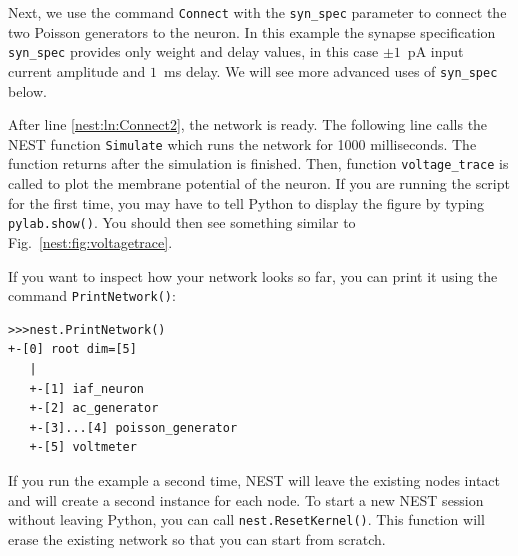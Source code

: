 \documentclass{article}
\begin{document}
Next, we use the command \lstinline!Connect! with the
\lstinline!syn_spec! parameter to connect the
two Poisson generators to the neuron. In this example the synapse
specification \lstinline!syn_spec! provides only weight and delay
values, in this case $\pm 1$~pA input current amplitude and $1$~ms
delay. We will see more advanced uses of  \lstinline!syn_spec! below.

After line \ref{nest:ln:Connect2}, the network is ready. The following
line calls the NEST function \lstinline!Simulate! which runs the
network for 1000 milliseconds. The function returns after the
simulation is finished. Then, function \lstinline!voltage_trace! is
called to plot the membrane potential of the neuron. If you are
running the script for the first time, you may have to tell Python to display
the figure by typing \lstinline!pylab.show()!. You should then see
something similar to Fig.~\ref{nest:fig:voltagetrace}.

If you want to inspect how your network looks so far, you can print
it using the command \lstinline!PrintNetwork()!:

\begin{lstlisting}[numbers=none]
>>>nest.PrintNetwork()
+-[0] root dim=[5]
   |
   +-[1] iaf_neuron
   +-[2] ac_generator
   +-[3]...[4] poisson_generator
   +-[5] voltmeter
\end{lstlisting}

If you run the example a second time, NEST will leave the existing
nodes intact and will create a second instance for each node. To start
a new NEST session without leaving Python, you can call
\lstinline!nest.ResetKernel()!. This function will erase the existing
network so that you can start from scratch.
\end{document}
